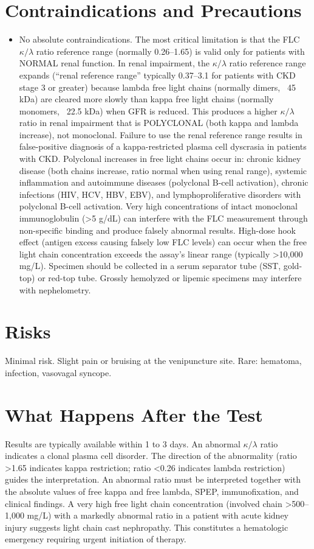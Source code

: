 \section*{Contraindications and Precautions}
\begin{itemize}
  \item No absolute contraindications. The most critical limitation is that the FLC $\kappa/\lambda$ ratio reference range (normally 0.26--1.65) is valid only for patients with NORMAL renal function. In renal impairment, the $\kappa/\lambda$ ratio reference range expands (``renal reference range'' typically 0.37--3.1 for patients with CKD stage 3 or greater) because lambda free light chains (normally dimers, ~45 kDa) are cleared more slowly than kappa free light chains (normally monomers, ~22.5 kDa) when GFR is reduced. This produces a higher $\kappa/\lambda$ ratio in renal impairment that is POLYCLONAL (both kappa and lambda increase), not monoclonal. Failure to use the renal reference range results in false-positive diagnosis of a kappa-restricted plasma cell dyscrasia in patients with CKD. Polyclonal increases in free light chains occur in: chronic kidney disease (both chains increase, ratio normal when using renal range), systemic inflammation and autoimmune diseases (polyclonal B-cell activation), chronic infections (HIV, HCV, HBV, EBV), and lymphoproliferative disorders with polyclonal B-cell activation. Very high concentrations of intact monoclonal immunoglobulin (>5 g/dL) can interfere with the FLC measurement through non-specific binding and produce falsely abnormal results. High-dose hook effect (antigen excess causing falsely low FLC levels) can occur when the free light chain concentration exceeds the assay's linear range (typically >10,000 mg/L). Specimen should be collected in a serum separator tube (SST, gold-top) or red-top tube. Grossly hemolyzed or lipemic specimens may interfere with nephelometry.
\end{itemize}
\section*{Risks}
Minimal risk. Slight pain or bruising at the venipuncture site. Rare: hematoma, infection, vasovagal syncope.

\section*{What Happens After the Test}
Results are typically available within 1 to 3 days. An abnormal $\kappa/\lambda$ ratio indicates a clonal plasma cell disorder. The direction of the abnormality (ratio >1.65 indicates kappa restriction; ratio <0.26 indicates lambda restriction) guides the interpretation. An abnormal ratio must be interpreted together with the absolute values of free kappa and free lambda, SPEP, immunofixation, and clinical findings. A very high free light chain concentration (involved chain >500--1,000 mg/L) with a markedly abnormal ratio in a patient with acute kidney injury suggests light chain cast nephropathy. This constitutes a hematologic emergency requiring urgent initiation of therapy.

